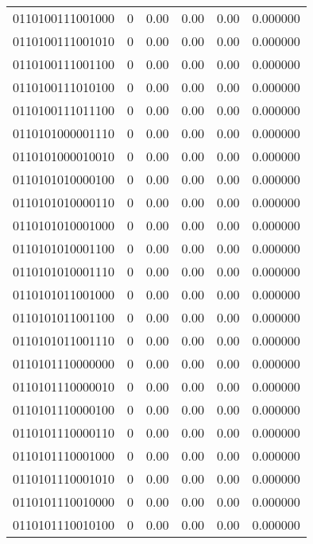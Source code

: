 \begin{tabular}{lrrrrr}
0110100111001000 &         0 &      0.00 &     0.00 &     0.00 &  0.000000 \\
0110100111001010 &         0 &      0.00 &     0.00 &     0.00 &  0.000000 \\
0110100111001100 &         0 &      0.00 &     0.00 &     0.00 &  0.000000 \\
0110100111010100 &         0 &      0.00 &     0.00 &     0.00 &  0.000000 \\
0110100111011100 &         0 &      0.00 &     0.00 &     0.00 &  0.000000 \\
0110101000001110 &         0 &      0.00 &     0.00 &     0.00 &  0.000000 \\
0110101000010010 &         0 &      0.00 &     0.00 &     0.00 &  0.000000 \\
0110101010000100 &         0 &      0.00 &     0.00 &     0.00 &  0.000000 \\
0110101010000110 &         0 &      0.00 &     0.00 &     0.00 &  0.000000 \\
0110101010001000 &         0 &      0.00 &     0.00 &     0.00 &  0.000000 \\
0110101010001100 &         0 &      0.00 &     0.00 &     0.00 &  0.000000 \\
0110101010001110 &         0 &      0.00 &     0.00 &     0.00 &  0.000000 \\
0110101011001000 &         0 &      0.00 &     0.00 &     0.00 &  0.000000 \\
0110101011001100 &         0 &      0.00 &     0.00 &     0.00 &  0.000000 \\
0110101011001110 &         0 &      0.00 &     0.00 &     0.00 &  0.000000 \\
0110101110000000 &         0 &      0.00 &     0.00 &     0.00 &  0.000000 \\
0110101110000010 &         0 &      0.00 &     0.00 &     0.00 &  0.000000 \\
0110101110000100 &         0 &      0.00 &     0.00 &     0.00 &  0.000000 \\
0110101110000110 &         0 &      0.00 &     0.00 &     0.00 &  0.000000 \\
0110101110001000 &         0 &      0.00 &     0.00 &     0.00 &  0.000000 \\
0110101110001010 &         0 &      0.00 &     0.00 &     0.00 &  0.000000 \\
0110101110010000 &         0 &      0.00 &     0.00 &     0.00 &  0.000000 \\
0110101110010100 &         0 &      0.00 &     0.00 &     0.00 &  0.000000 \\

\end{tabular}
